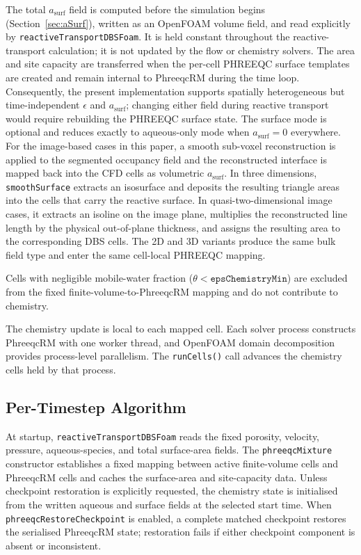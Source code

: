 The total $a_{\mathrm{surf}}$ field is computed before the simulation begins
(Section~\ref{sec:aSurf}), written as an OpenFOAM volume field, and read
explicitly by \texttt{reactiveTransportDBSFoam}. It is held constant throughout
the reactive-transport calculation; it is not updated by the flow or chemistry
solvers. The area and site capacity are transferred when the per-cell
PHREEQC surface templates are created and remain internal to PhreeqcRM during
the time loop. Consequently, the present implementation supports spatially
heterogeneous but time-independent $\epsilon$ and $a_{\mathrm{surf}}$; changing
either field during reactive transport would require rebuilding the PHREEQC
surface state. The surface mode is optional and reduces exactly to
aqueous-only mode when $a_{\mathrm{surf}} = 0$ everywhere.
For the image-based cases in this paper, a smooth sub-voxel reconstruction is
applied to the segmented occupancy field and the reconstructed
interface is mapped back into the CFD cells as volumetric
$a_{\mathrm{surf}}$. In three
dimensions, \texttt{smoothSurface} extracts an isosurface and deposits the
resulting triangle areas into the cells that carry the reactive surface. In
quasi-two-dimensional image cases, it extracts an isoline on the image plane,
multiplies the reconstructed line length by the physical out-of-plane
thickness, and assigns the resulting area to the corresponding DBS cells. The
2D and 3D variants produce the same bulk field type and enter the same
cell-local PHREEQC mapping.

Cells with negligible mobile-water fraction
($\theta < \texttt{epsChemistryMin}$) are excluded from the fixed
finite-volume-to-PhreeqcRM mapping and do not contribute to chemistry.

The chemistry update is local to each mapped cell. Each solver process
constructs PhreeqcRM with one worker thread, and OpenFOAM domain decomposition
provides process-level parallelism.
The \texttt{runCells()} call advances the chemistry cells held by that process.

\subsection{Per-Timestep Algorithm}

At startup, \texttt{reactiveTransportDBSFoam} reads the fixed porosity,
velocity, pressure, aqueous-species, and total surface-area fields. The
\texttt{phreeqcMixture} constructor establishes a fixed mapping between active
finite-volume cells and PhreeqcRM cells and caches the surface-area and
site-capacity data. Unless checkpoint restoration is explicitly requested, the
chemistry state is initialised from the written aqueous and surface fields at
the selected start time. When \texttt{phreeqcRestoreCheckpoint} is enabled, a
complete matched checkpoint restores the serialised PhreeqcRM state;
restoration fails if either checkpoint component is absent or inconsistent.


